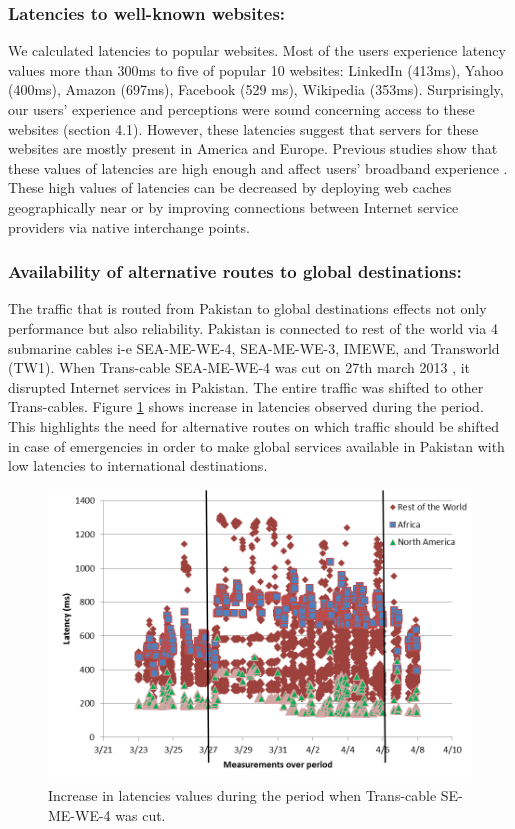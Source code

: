 \documentclass{sig-alternate-10pt}
\begin{document}
\subsubsection{Latencies to well-known websites:}
We calculated latencies to popular websites. Most of the users experience latency values more than 300ms to five of popular 10 websites: LinkedIn (413ms), Yahoo (400ms), Amazon (697ms), Facebook (529 ms), Wikipedia (353ms). Surprisingly, our users' experience and perceptions were sound concerning access to these websites (section 4.1). However, these latencies suggest that servers for these websites are mostly present in America and Europe. Previous studies show that these values of latencies are high enough and affect users' broadband experience \cite{13,24}. These high values of latencies can be decreased by deploying web caches geographically near or by improving connections between Internet service providers via native interchange points.
\subsubsection{Availability of alternative routes to global destinations:}
The traffic that is routed from Pakistan to global destinations effects not only performance but also reliability. Pakistan is connected to rest of the world via 4 submarine cables i-e SEA-ME-WE-4, SEA-ME-WE-3, IMEWE, and Transworld (TW1). When Trans-cable SEA-ME-WE-4 was cut on 27th march 2013 \cite{27}, it disrupted Internet services in Pakistan. The entire traffic was shifted to other Trans-cables. Figure \ref{Fig:14} shows increase in latencies observed during the period. This highlights the need for alternative routes on which traffic should be shifted in case of emergencies in order to make global services available in Pakistan with low latencies to international destinations.
\begin{figure}[h!]
\begin {center}
   \includegraphics[height=0.2 \textheight,width=0.48 \textwidth]{13.png}
   \end {center}
 \caption{Increase in latencies values during the period when Trans-cable SE-ME-WE-4 was cut.}\label{Fig:14}
\end{figure}
\end{document}
